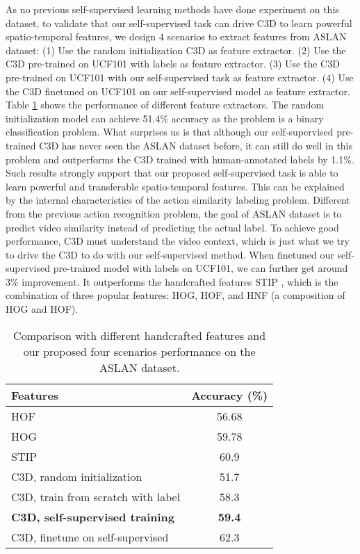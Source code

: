 \documentclass[10pt,twocolumn,letterpaper]{article}
\begin{document}
As no previous self-supervised learning methods have done experiment on this dataset, to validate that our self-supervised task can drive C3D to learn powerful spatio-temporal features, we design 4 scenarios to extract features from ASLAN dataset: (1) Use the random initialization C3D as feature extractor. (2) Use the C3D pre-trained on UCF101 with labels as feature extractor. (3) Use the C3D pre-trained on UCF101 with our self-supervised task as feature extractor. (4) Use the C3D finetuned on UCF101 on our self-supervised model as feature extractor. Table \ref{ASLAN} shows the performance of different feature extractors. The random initialization model can achieve 51.4\% accuracy as the problem is a binary classification problem. What surprises us is that although our self-supervised pre-trained C3D has never seen the ASLAN dataset before, it can still do well in this problem and outperforms the C3D trained with human-annotated labels by 1.1\%. Such results strongly support that our proposed self-supervised task is able to learn powerful and transferable spatio-temporal features. This can be explained by the internal characteristics of the action similarity labeling problem. Different from the previous action recognition problem, the goal of ASLAN dataset is to predict video similarity instead of predicting the actual label. To achieve good performance, C3D must understand the video context, which is just what we try to drive the C3D to do with our self-supervised method. When finetuned our self-supervised pre-trained model with labels on UCF101, we can further get around 3\% improvement. It outperforms the handcrafted features STIP \cite{kliper2012action}, which is the combination of three popular features: HOG, HOF, and HNF (a composition of HOG and HOF).     

\begin{table}\caption{Comparison with different handcrafted features and our proposed four scenarios performance on the ASLAN dataset.}
\vspace{-6pt}
\begin{center}
\begin{tabular}{lc}
\hline
Features & Accuracy (\%) \\
\hline
HOF \cite{kliper2012action} & 56.68 \\
HOG \cite{kliper2012action} & 59.78 \\
STIP \cite{kliper2012action} & 60.9 \\
\hline
C3D, random initialization & 51.7 \\
C3D, train from scratch with label & 58.3 \\
\textbf{C3D, self-supervised training} & \textbf{59.4} \\
C3D, finetune on self-supervised & 62.3 \\
\hline
\end{tabular}
\end{center}\vspace{-7mm}
\label{ASLAN}
\end{table}
\end{document}

